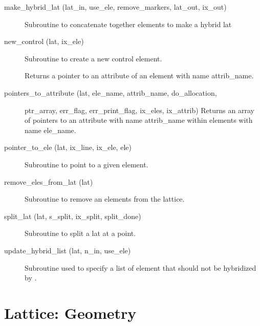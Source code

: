 \begin{description}
\label{r:make.hybrid.lat}
\item[make_hybrid_lat (lat_in, use_ele, remove_markers, lat_out, ix_out)] \Newline
Subroutine to concatenate together elements to make a hybrid lat 

\label{r:new.control}
\item[new_control (lat, ix_ele)] \Newline
Subroutine to create a new control element. 

\label{r:pointer.to.attribute}
\item[\protect\parbox{6in}{pointer_to_attribute (ele, attrib_name, do_allocation, 
\\ \hspace*{2in} ptr_attrib, ix_attrib, err_flag, err_print_flag)}] \Newline
Returns a pointer to an attribute of an element with name attrib_name. 

\label{r:pointers.to.attribute}
\item[pointers_to_attribute (lat, ele_name, attrib_name, do_allocation,] \Newline 
                    ptr_array, err_flag, err_print_flag, ix_eles, ix_attrib)
Returns an array of pointers to an attribute with name attrib_name within 
elements with name ele_name.

\label{r:pointer.to.ele}
\item[pointer_to_ele (lat, ix_line, ix_ele, ele)] \Newline 
Subroutine to point to a given element.

\label{r:remove.eles.from.lat}
\item[remove_eles_from_lat (lat)] \Newline 
Subroutine to remove an elements from the lattice.

\label{r:split.lat}
\item[split_lat (lat, s_split, ix_split, split_done)] \Newline
Subroutine to split a lat at a point.

\label{r:update.hybrid.list}
\item[update_hybrid_list (lat, n_in, use_ele)] \Newline
Subroutine used to specify a list of element that should not be
hybridized by .

\end{description}

\section{Lattice: Geometry}
\label{r:geom}     

